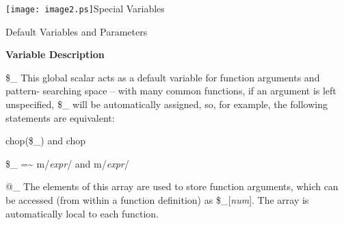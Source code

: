 \documentclass[a4paper,11pt]{book}
\begin{document}

\noindent 

\noindent 

\noindent 

\noindent 

\noindent  

\noindent  

\noindent 

\noindent 

\noindent 

\noindent 

\noindent 

\noindent 

\noindent 

\noindent 

\noindent 

\noindent 

\noindent 

\noindent \texttt{[image: image2.ps]}Special Variables

\noindent 

\noindent 

\noindent 

\noindent 

\noindent 

\noindent 

\noindent Default Variables and Parameters

\noindent 

\noindent \textbf{Variable Description}

\noindent 

\noindent \$\_ This  global scalar acts  as a  default  variable  for  function  arguments  and  pattern- searching  space -- with  many common  functions,  if  an  argument  is  left unspecified,  \$\_ will be automatically  assigned,  so,  for  example,  the following statements are equivalent:

\noindent 

\noindent chop(\$\_) and chop

\noindent 

\noindent \$\_   =\~{} m/\textit{expr}/ and m/\textit{expr}/

\noindent 

\noindent @\_ The elements of this array are used to store function arguments, which can be accessed (from within a function definition) as \$\_[\textit{num}]. The array is automatically local to each function.
\end{document}
